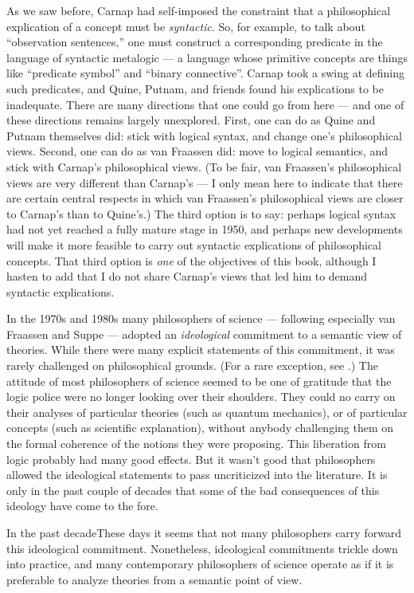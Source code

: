 As we saw before, Carnap had self-imposed the constraint that a
philosophical explication of a concept must be {\it syntactic}.  So,
for example, to talk about ``observation sentences,'' one must
construct a corresponding predicate in the language of syntactic
metalogic --- a language whose primitive concepts are things like
``predicate symbol'' and ``binary connective''.  Carnap took a swing
at defining such predicates, and Quine, Putnam, and friends found his
explications to be inadequate.  There are many directions that one
could go from here --- and one of these directions remains largely
unexplored.  First, one can do as Quine and Putnam themselves did:
stick with logical syntax, and change one's philosophical views.
Second, one can do as van Fraassen did: move to logical semantics, and
stick with Carnap's philosophical views.  (To be fair, van Fraassen's
philosophical views are very different than Carnap's --- I only mean
here to indicate that there are certain central respects in which van
Fraassen's philosophical views are closer to Carnap's than to
Quine's.)  The third option is to say: perhaps logical syntax had not
yet reached a fully mature stage in 1950, and perhaps new developments
will make it more feasible to carry out syntactic explications of
philosophical concepts.  That third option is {\it one} of the
objectives of this book, although I hasten to add that I do not share
Carnap's views that led him to demand syntactic explications.

In the 1970s and 1980s many philosophers of science --- following
especially van Fraassen and Suppe --- adopted an {\it ideological}
commitment to a semantic view of theories.  While there were many
explicit statements of this commitment, it was rarely challenged on
philosophical grounds.  (For a rare exception, see \cite{friedman}.)
The attitude of most philosophers of science seemed to be one of
gratitude that the logic police were no longer looking over their
shoulders.  They could no carry on their analyses of particular
theories (such as quantum mechanics), or of particular concepts (such
as scientific explanation), without anybody challenging them on the
formal coherence of the notions they were proposing.  This liberation
from logic probably had many good effects.  But it wasn't good that
philosophers allowed the ideological statements to pass uncriticized
into the literature.  It is only in the past couple of decades that
some of the bad consequences of this ideology have come to the fore.

In the past decadeThese days it seems that not many philosophers carry
forward this ideological commitment.  Nonetheless, ideological
commitments trickle down into practice, and many contemporary
philosophers of science operate as if it is preferable to analyze
theories from a semantic point of view.


